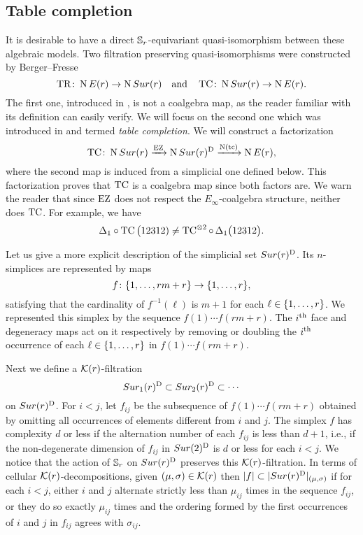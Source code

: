 
\subsection{Table completion}\label{ss:table completion}

It is desirable to have a direct $\mathbb{S}_r$-equivariant quasi-isomorphism between these algebraic models.
Two filtration preserving quasi-isomorphisms were constructed by Berger--Fresse
\[
\operatorname{TR} \colon \operatorname{N}E(r) \to \operatorname{N}Sur(r)
\quad \text{and} \quad
\operatorname{TC} \colon \operatorname{N}Sur(r) \to \operatorname{N} E(r).
\]
The first one, introduced in \cite[1$\cdot$3]{berger2004combinatorial}, is not a coalgebra map, as the reader familiar with its definition can easily verify.
We will focus on the second one which was introduced in \cite{berger2002prismatic} and termed \textit{table completion}.
We will construct a factorization
\[
\operatorname{TC} \colon \operatorname{N}Sur(r) \xrightarrow{\operatorname{EZ}} \operatorname{N}Sur(r)^{\mathrm{D}} \xrightarrow{\operatorname{N}(\operatorname{tc})} \operatorname{N} E(r),
\]
where the second map is induced from a simplicial one defined below.
This factorization proves that $\operatorname{TC}$ is a coalgebra map since both factors are.
We warn the reader that since $\operatorname{EZ}$ does not respect the $E_\infty$-coalgebra structure,
neither does $\operatorname{TC}$.
For example, we have
\[
\Delta_1 \circ \operatorname{TC}\big(12312) \neq \operatorname{TC}^{\otimes 2} \circ \, \Delta_1 \big(12312\big).
\]

Let us give a more explicit description of the simplicial set $Sur(r)^{\mathrm{D}}$.
Its $n$-simplices are represented by maps
\[
f \colon \{1,\dots,rm+r\} \to \{1,\dots,r\},
\]
satisfying that the cardinality of $f^{-1}(\ell)$ is $m+1$ for each $\ell \in \{1,\dots,r\}$.
We represented this simplex by the sequence $f(1) \dotsb f(rm+r)$.
The $i^{\mathrm{th}}$ face and degeneracy maps act on it respectively by removing or doubling the $i^{\mathrm{th}}$ occurrence of each $\ell \in \{1,\dots,r\}$ in $f(1) \dotsb f(rm+r)$.

Next we define a $\mathcal{K}(r)$-filtration
\[
Sur_1(r)^{\mathrm{D}} \subset Sur_2(r)^{\mathrm{D}} \subset \dotsb
\]
on $Sur(r)^{\mathrm{D}}$.
For $i<j$, let $f_{ij}$ be the subsequence of $f(1) \dotsm f(rm+r)$ obtained by omitting all occurrences of elements different from $i$ and $j$.
The simplex $f$ has complexity $d$ or less if the alternation number of each $f_{ij}$ is less than $d+1$, i.e., if the non-degenerate dimension of $f_{ij}$ in $Sur(2)^{\mathrm{D}}$ is $d$ or less for each $i<j$.
We notice that the action of $\mathbb{S}_r$ on $Sur(r)^{\mathrm{D}}$ preserves this $\mathcal{K}(r)$-filtration.
In terms of cellular $\mathcal{K}(r)$-decompositions, given $(\mu,\sigma) \in \mathcal{K}(r)$ then $\lvert f\rvert \subset \lvert Sur(r)^{\mathrm{D}}\rvert_{(\mu,\sigma)}$ if for each $i<j$, either $i$ and $j$ alternate strictly less than $\mu_{ij}$ times in the sequence $f_{ij}$, or they do so exactly $\mu_{ij}$ times and the ordering formed by the first occurrences of $i$ and $j$ in $f_{ij}$ agrees with $\sigma_{ij}$.


